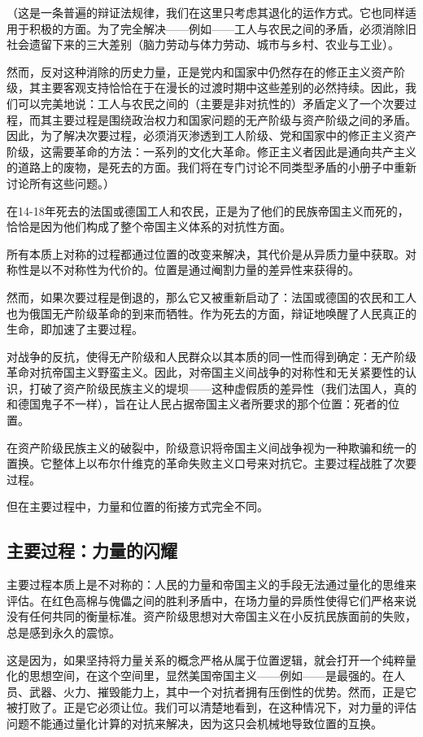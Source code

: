 \documentclass[fontset=fandol, a4paper, 12pt, twoside]{ctexart}
\begin{document}
（这是一条普遍的辩证法规律，我们在这里只考虑其退化的运作方式。它也同样适用于积极的方面。为了完全解决——例如——工人与农民之间的矛盾，必须消除旧社会遗留下来的三大差别（脑力劳动与体力劳动、城市与乡村、农业与工业）。

然而，反对这种消除的历史力量，正是党内和国家中仍然存在的修正主义资产阶级，其主要客观支持恰恰在于在漫长的过渡时期中这些差别的必然持续。因此，我们可以完美地说：工人与农民之间的（主要是非对抗性的）矛盾定义了一个次要过程，而其主要过程是围绕政治权力和国家问题的无产阶级与资产阶级之间的矛盾。因此，为了解决次要过程，必须消灭渗透到工人阶级、党和国家中的修正主义资产阶级，这需要革命的方法：一系列的文化大革命。修正主义者因此是通向共产主义的道路上的废物，是死去的方面。我们将在专门讨论不同类型矛盾的小册子中重新讨论所有这些问题。）

在14-18年死去的法国或德国工人和农民，正是为了他们的民族帝国主义而死的，恰恰是因为他们构成了整个帝国主义体系的对抗性方面。

所有本质上对称的过程都通过位置的改变来解决，其代价是从异质力量中获取。对称性是以不对称性为代价的。位置是通过阉割力量的差异性来获得的。

然而，如果次要过程是倒退的，那么它又被重新启动了：法国或德国的农民和工人也为俄国无产阶级革命的到来而牺牲。作为死去的方面，辩证地唤醒了人民真正的生命，即加速了主要过程。

对战争的反抗，使得无产阶级和人民群众以其本质的同一性而得到确定：无产阶级革命对抗帝国主义野蛮主义。因此，对帝国主义间战争的对称性和无关紧要性的认识，打破了资产阶级民族主义的堤坝——这种虚假质的差异性（我们法国人，真的和德国鬼子不一样），旨在让人民占据帝国主义者所要求的那个位置：死者的位置。

在资产阶级民族主义的破裂中，阶级意识将帝国主义间战争视为一种欺骗和统一的置换。它整体上以布尔什维克的革命失败主义口号来对抗它。主要过程战胜了次要过程。

但在主要过程中，力量和位置的衔接方式完全不同。

\subsection{主要过程：力量的闪耀}

主要过程本质上是不对称的：人民的力量和帝国主义的手段无法通过量化的思维来评估。在红色高棉与傀儡之间的胜利矛盾中，在场力量的异质性使得它们严格来说没有任何共同的衡量标准。资产阶级思想对大帝国主义在小反抗民族面前的失败，总是感到永久的震惊。

这是因为，如果坚持将力量关系的概念严格从属于位置逻辑，就会打开一个纯粹量化的思想空间，在这个空间里，显然美国帝国主义——例如——是最强的。在人员、武器、火力、摧毁能力上，其中一个对抗者拥有压倒性的优势。然而，正是它被打败了。正是它必须让位。我们可以清楚地看到，在这种情况下，对力量的评估问题不能通过量化计算的对抗来解决，因为这只会机械地导致位置的互换。
\end{document}
